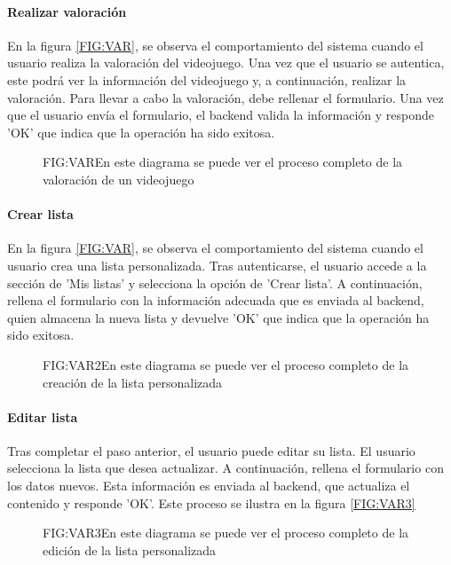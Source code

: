 
\paragraph{Realizar valoración}
En la figura \ref{FIG:VAR}, se observa el comportamiento del sistema cuando el usuario realiza la valoración del videojuego. 
Una vez que el usuario se autentica, este podrá ver la información del videojuego y, a continuación, realizar la valoración. 
Para llevar a cabo la valoración, debe rellenar el formulario. Una vez que el usuario envía el formulario, el backend valida 
la información y responde 'OK' que indica que la operación ha sido exitosa.

\begin{figure}[Flujo realizar valoración]{FIG:VAR}{En este diagrama se puede ver el proceso completo de la valoración de un videojuego}
\end{figure}

\paragraph{Crear lista}
En la figura \ref{FIG:VAR}, se observa el comportamiento del sistema cuando el usuario crea una lista personalizada. Tras autenticarse, 
el usuario accede a la sección de 'Mis listas' y selecciona la opción de 'Crear lista'. A continuación, rellena el formulario con la información adecuada
que es enviada al backend, quien almacena la nueva lista y devuelve 'OK' que indica que la operación ha sido exitosa.

\begin{figure}[Flujo crear lista personalizada]{FIG:VAR2}{En este diagrama se puede ver el proceso completo de la creación de la lista personalizada }
\end{figure}

\paragraph{Editar lista}
Tras completar el paso anterior, el usuario puede editar su lista. El usuario selecciona la lista que desea
actualizar. A continuación, rellena el formulario con los datos nuevos. Esta información es enviada al backend, que actualiza el contenido 
y responde 'OK'. Este proceso se ilustra en la figura \ref{FIG:VAR3}

\begin{figure}[Flujo editar lista personalizada]{FIG:VAR3}{En este diagrama se puede ver el proceso completo de la edición de la lista personalizada }
\end{figure}
